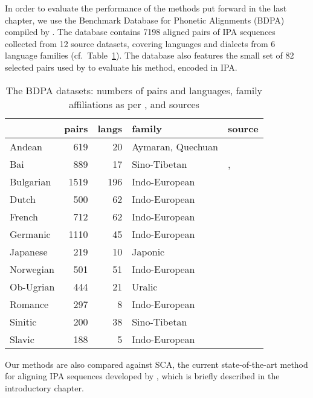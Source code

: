 \documentclass[a4paper]{report}
\begin{document}
In order to evaluate the performance of the methods put forward in the last chapter,
we use the Benchmark Database for Phonetic Alignments (BDPA) compiled by \citet{2014_List_Prokić}.
The database contains 7198 aligned pairs of IPA sequences collected from 12 source datasets,
covering languages and dialects from 6 language families (cf.~Table~\ref{tab:bdpa}).
The database also features the small set of 82 selected pairs used by \citet{1996_Covington} to evaluate his method, encoded in IPA.

\begin{table}[h]
	\centering\small
	\begin{tabular}{l r r l l}
		\toprule
		& pairs & langs & family & source \\
		\midrule
		Andean		& 619	& 20	& Aymaran, Quechuan	& \citet{2006_Heggarty} \\
		Bai			& 889	& 17	& Sino-Tibetan		& \citet{2006_Wang}, \citet{2007_Allen} \\
		Bulgarian	& 1519	& 196	& Indo-European		& \citet{2009_Prokić_al} \\
		Dutch		& 500	& 62	& Indo-European		& \citet{2005_Schutter_al} \\
		French		& 712	& 62	& Indo-European		& \citet{1925_Gauchat_al} \\
		Germanic	& 1110	& 45	& Indo-European		& \citet{2009_Renfrew_Heggarty} \\
		Japanese	& 219	& 10	& Japonic			& \citet{1973_Shirō} \\
		Norwegian	& 501	& 51	& Indo-European		& \citet{2011_Almberg_Skarbø} \\
		Ob-Ugrian	& 444	& 21	& Uralic			& \citet{2011_Zhivlov} \\
		Romance		& 297	& 8		& Indo-European		& \citet{2009_Renfrew_Heggarty} \\
		Sinitic		& 200	& 38	& Sino-Tibetan		& \citet{2004_Hóu} \\
		Slavic		& 188	& 5		& Indo-European		& \citet{2008_Derksen} \\
		\bottomrule
	\end{tabular}
	\caption{The BDPA datasets: numbers of pairs and languages, family affiliations as per \citet{2018_Hammarström_al}, and sources}
	\label{tab:bdpa}
\end{table}

Our methods are also compared against SCA, the current state-of-the-art method for aligning IPA sequences developed by \citet{2012_List},
which is briefly described in the introductory chapter.
\end{document}
